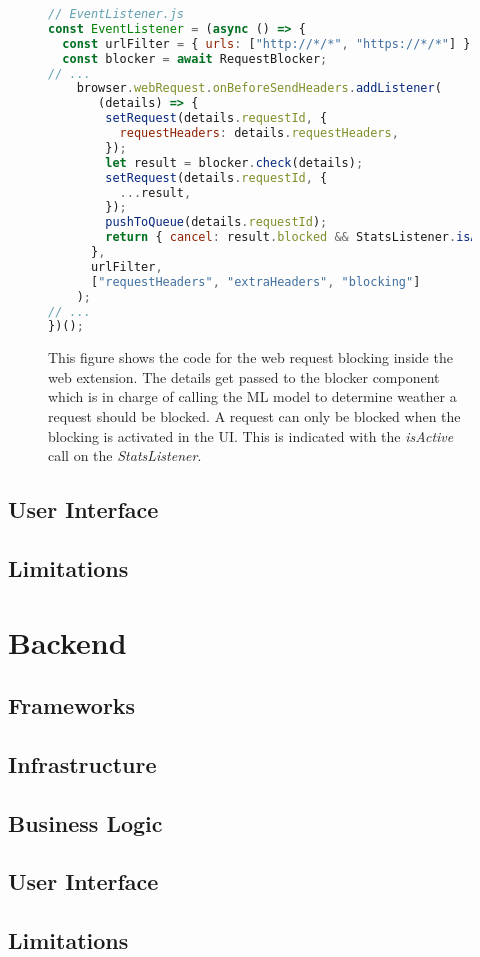 \begin{figure}[ht!]
\begin{lstlisting}[language=JavaScript]
// EventListener.js
const EventListener = (async () => {
  const urlFilter = { urls: ["http://*/*", "https://*/*"] };
  const blocker = await RequestBlocker;
// ...
    browser.webRequest.onBeforeSendHeaders.addListener(
       (details) => {
        setRequest(details.requestId, {
          requestHeaders: details.requestHeaders,
        });
        let result = blocker.check(details);
        setRequest(details.requestId, {
          ...result,
        });
        pushToQueue(details.requestId);
        return { cancel: result.blocked && StatsListener.isActive() };
      },
      urlFilter,
      ["requestHeaders", "extraHeaders", "blocking"]
    );
// ...
})();
\end{lstlisting}
\caption{This figure shows the code for the web request blocking inside the web extension. The details get passed to the blocker component 
  which is in charge of calling the ML model to determine weather a request should be blocked. A request can only be blocked when the blocking is
  activated in the UI. This is indicated with the \emph{isActive} call on the \emph{StatsListener}.
}
\end{figure}
\subsection{User Interface}
\subsection{Limitations}

\section{Backend}
\subsection{Frameworks}
\subsection{Infrastructure}
\subsection{Business Logic}
\subsection{User Interface}
\subsection{Limitations}
